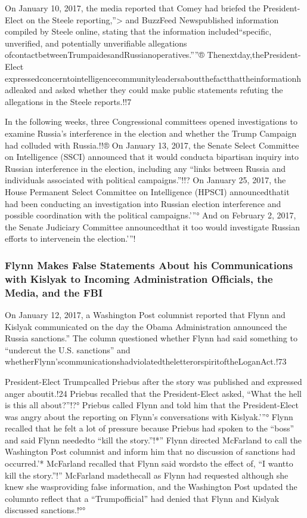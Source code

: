 On January 10, 2017, the media reported that Comey had briefed the President-Elect on the Steele reporting,''>
and BuzzFeed Newspublished information compiled by Steele online, stating that the information included“specific, unverified, and potentially unverifiable allegations ofcontactbetweenTrumpaidesandRussianoperatives.”''®
Thenextday,thePresident-Elect expressedconcerntointelligencecommunityleadersaboutthefactthattheinformationhadleaked and asked whether they could make public statements refuting the allegations in the Steele reports.!!7

In the following weeks, three Congressional committees opened investigations to examine Russia’s interference in the election and whether the Trump Campaign had colluded with Russia.!!®
On January 13, 2017, the Senate Select Committee on Intelligence (SSCI) announced that it would conducta bipartisan inquiry into Russian interference in the election, including any “links between Russia and individuals associated with political campaigns.”!!?
On January 25, 2017, the House Permanent Select Committee on Intelligence (HPSCI) announcedthatit had been conducting an investigation into Russian election interference and possible coordination with the political campaigns.'”°
And on February 2, 2017, the Senate Judiciary Committee announcedthat it too would investigate Russian efforts to intervenein the election.'”!


\subsubsection{Flynn Makes False Statements About his Communications with Kislyak to Incoming Administration Officials, the Media, and the FBI}

On January 12, 2017, a Washington Post columnist reported that Flynn and Kislyak communicated on the day the Obama Administration announced the Russia sanctions.”
The column questioned whether Flynn had said something to “undercut the U.S. sanctions” and whetherFlynn’scommunicationshadviolatedtheletterorspiritoftheLoganAct.!73

President-Elect Trumpcalled Priebus after the story was published and expressed anger aboutit.!24
Priebus recalled that the President-Elect asked, “What the hell is this all about?”!?°
Priebus called Flynn and told him that the President-Elect was angry about the reporting on Flynn’s conversations with Kislyak.'”°
Flynn recalled that he felt a lot of pressure because Priebus had spoken to the “boss” and said Flynn neededto “kill the story.”!*”
Flynn directed McFarland to call the Washington Post columnist and inform him that no discussion of sanctions had occurred.'*
McFarland recalled that Flynn said wordsto the effect of, “I wantto kill the story.”!”
McFarland madethecall as Flynn had requested although she knew she wasproviding false information, and the Washington Post updated the columnto reflect that a “Trumpofficial” had denied that Flynn and Kislyak discussed sanctions.!°°

